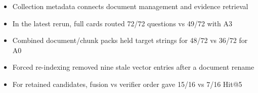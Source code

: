 
\begin{itemize}
\item Collection metadata connects document management and evidence retrieval
\item In the latest rerun, full cards routed 72/72 questions vs 49/72 with A3
\item Combined document/chunk packs held target strings for 48/72 vs 36/72 for A0
\item Forced re-indexing removed nine stale vector entries after a document rename
\item For retained candidates, fusion vs verifier order gave 15/16 vs 7/16 Hit@5
\end{itemize}

